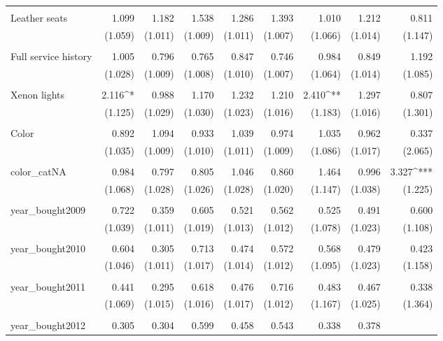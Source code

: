 \begin{table}[!htbp]
\begin{tabular}{@{\extracolsep{5pt}}lD{.}{.}{-3} D{.}{.}{-3} D{.}{.}{-3} D{.}{.}{-3} D{.}{.}{-3} D{.}{.}{-3} D{.}{.}{-3} D{.}{.}{-3} }
  & & & & & & & & \\ 
 Leather seats & 1.099 & 1.182 & 1.538 & 1.286 & 1.393 & 1.010 & 1.212 & 0.811 \\ 
  & (1.059) & (1.011) & (1.009) & (1.011) & (1.007) & (1.066) & (1.014) & (1.147) \\ 
  & & & & & & & & \\ 
 Full service history & 1.005 & 0.796 & 0.765 & 0.847 & 0.746 & 0.984 & 0.849 & 1.192 \\ 
  & (1.028) & (1.009) & (1.008) & (1.010) & (1.007) & (1.064) & (1.014) & (1.085) \\ 
  & & & & & & & & \\ 
 Xenon lights & 2.116^{*} & 0.988 & 1.170 & 1.232 & 1.210 & 2.410^{**} & 1.297 & 0.807 \\ 
  & (1.125) & (1.029) & (1.030) & (1.023) & (1.016) & (1.183) & (1.016) & (1.301) \\ 
  & & & & & & & & \\ 
 Color & 0.892 & 1.094 & 0.933 & 1.039 & 0.974 & 1.035 & 0.962 & 0.337 \\ 
  & (1.035) & (1.009) & (1.010) & (1.011) & (1.009) & (1.086) & (1.017) & (2.065) \\ 
  & & & & & & & & \\ 
 color\_catNA & 0.984 & 0.797 & 0.805 & 1.046 & 0.860 & 1.464 & 0.996 & 3.327^{***} \\ 
  & (1.068) & (1.028) & (1.026) & (1.028) & (1.020) & (1.147) & (1.038) & (1.225) \\ 
  & & & & & & & & \\ 
 year\_bought2009 & 0.722 & 0.359 & 0.605 & 0.521 & 0.562 & 0.525 & 0.491 & 0.600 \\ 
  & (1.039) & (1.011) & (1.019) & (1.013) & (1.012) & (1.078) & (1.023) & (1.108) \\ 
  & & & & & & & & \\ 
 year\_bought2010 & 0.604 & 0.305 & 0.713 & 0.474 & 0.572 & 0.568 & 0.479 & 0.423 \\ 
  & (1.046) & (1.011) & (1.017) & (1.014) & (1.012) & (1.095) & (1.023) & (1.158) \\ 
  & & & & & & & & \\ 
 year\_bought2011 & 0.441 & 0.295 & 0.618 & 0.476 & 0.716 & 0.483 & 0.467 & 0.338 \\ 
  & (1.069) & (1.015) & (1.016) & (1.017) & (1.012) & (1.167) & (1.025) & (1.364) \\ 
  & & & & & & & & \\ 
 year\_bought2012 & 0.305 & 0.304 & 0.599 & 0.458 & 0.543 & 0.338 & 0.378 &  \\ 

\end{tabular}
\end{table}
